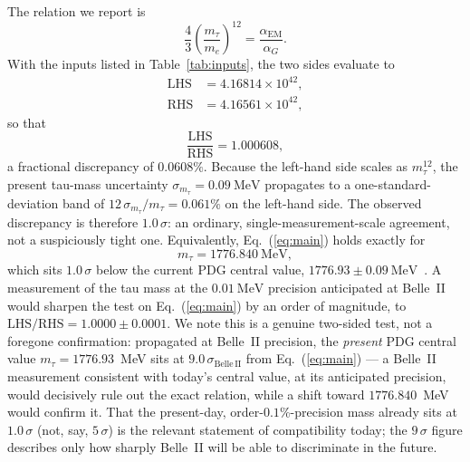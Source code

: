 \documentclass[aps,prd,preprint,amsmath,amssymb,nofootinbib]{revtex4-2}
\begin{document}
The relation we report is
\begin{equation}
\frac{4}{3}\left(\frac{m_\tau}{m_e}\right)^{\!12}
= \frac{\alpha_{\mathrm{EM}}}{\alpha_G}.
\label{eq:main}
\end{equation}
With the inputs listed in Table~\ref{tab:inputs}, the two sides evaluate to
\begin{align}
\text{LHS} &= 4.16814\times 10^{42}, \nonumber\\
\text{RHS} &= 4.16561\times 10^{42},
\end{align}
so that
\begin{equation}
\frac{\text{LHS}}{\text{RHS}} = 1.000608,
\end{equation}
a fractional discrepancy of $0.0608\%$. Because the left-hand side scales as
$m_\tau^{12}$, the present tau-mass uncertainty
$\sigma_{m_\tau}=0.09~\mathrm{MeV}$ propagates to a one-standard-deviation band
of $12\,\sigma_{m_\tau}/m_\tau = 0.061\%$ on the left-hand side. The observed
discrepancy is therefore $1.0\,\sigma$: an ordinary, single-measurement-scale
agreement, not a suspiciously tight one. Equivalently, Eq.~(\ref{eq:main})
holds exactly for
\begin{equation}
m_\tau = 1776.840~\mathrm{MeV},
\end{equation}
which sits $1.0\,\sigma$ below the current PDG central value,
$1776.93\pm 0.09~\mathrm{MeV}$~\cite{pdg2024}. A measurement of the tau mass at
the $0.01~\mathrm{MeV}$ precision anticipated at Belle~II~\cite{belleii} would
sharpen the test on Eq.~(\ref{eq:main}) by an order of magnitude, to
$\mathrm{LHS/RHS} = 1.0000 \pm 0.0001$. We note this is a genuine two-sided
test, not a foregone confirmation: propagated at Belle~II precision, the
\emph{present} PDG central value $m_\tau=1776.93$~MeV sits at
$9.0\,\sigma_{\mathrm{Belle\,II}}$ from Eq.~(\ref{eq:main}) --- a Belle~II
measurement consistent with today's central value, at its anticipated
precision, would decisively rule out the exact relation, while a shift toward
$1776.840$~MeV would confirm it. That the present-day, order-$0.1\%$-precision
mass already sits at $1.0\,\sigma$ (not, say, $5\,\sigma$) is the relevant
statement of compatibility today; the $9\,\sigma$ figure describes only how
sharply Belle~II will be able to discriminate in the future.
\end{document}
